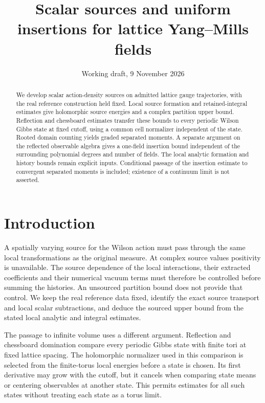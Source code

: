\documentclass[11pt,letterpaper,reqno]{amsart}
\title[Scalar sources and uniform insertions]{Scalar sources and uniform insertions for lattice Yang--Mills fields}
\date{Working draft, 9 November 2026}
\numberwithin{equation}{section}
\theoremstyle{definition}
\theoremstyle{remark}
\begin{document}
\raggedbottom
\begin{abstract}
We develop scalar action-density sources on admitted lattice gauge
trajectories, with the real reference construction held fixed. Local
source formation and retained-integral estimates give holomorphic
source energies and a complex partition upper bound. Reflection and
chessboard estimates transfer these bounds to every periodic Wilson
Gibbs state at fixed cutoff, using a common cell normalizer independent
of the state. Rooted domain counting yields graded separated moments.
A separate argument on the reflected observable algebra gives a
one-field insertion bound independent of the surrounding polynomial
degrees and number of fields. The local analytic formation and
history bounds remain explicit inputs. Conditional passage of the
insertion estimate to convergent separated moments is included;
existence of a continuum limit is not asserted.
\end{abstract}
\maketitle
\tableofcontents

\section{Introduction}

A spatially varying source for the Wilson action must pass through
the same local transformations as the original measure. At complex
source values positivity is unavailable. The source dependence of
the local interactions, their extracted coefficients and their
numerical vacuum terms must therefore be controlled before summing
the histories. An unsourced partition bound does not provide that
control. We keep the real reference data fixed, identify the exact
source transport and local scalar subtractions, and deduce the
sourced upper bound from the stated local analytic and integral
estimates.

The passage to infinite volume uses a different argument. Reflection
and chessboard domination compare every periodic Gibbs state with
finite tori at fixed lattice spacing. The holomorphic normalizer
used in this comparison is selected from the finite-torus local
energies before a state is chosen. Its first derivative may grow
with the cutoff, but it cancels when comparing state means or
centering observables at another state. This permits estimates for
all such states without treating each state as a torus limit.
\end{document}
